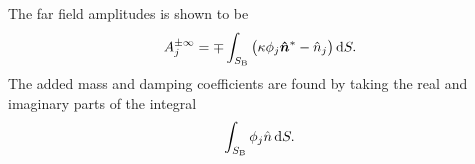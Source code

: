 The far field amplitudes is shown to be
\[
    A_j^{\pm \infty} = \mp \int_{S_{\mathrm{B}}} \big( \kappa \phi_j \bm{\hat{n}}^{\ast} - \hat{n}_j \big) \,\mathrm{d} S.
\]
The added mass and damping coefficients are found by taking the real and imaginary parts of the integral
\[
    \int_{S_{\mathrm{B}}} \phi_j \hat{n} \,\mathrm{d} S.
\]